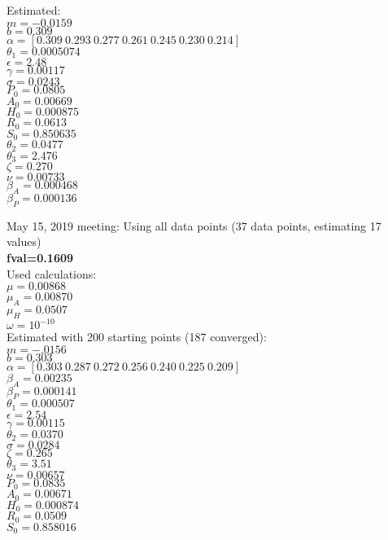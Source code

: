\documentclass[12pt]{article}
\begin{document}
\begin{multicols}{2}
Estimated: \\
$m=-0.0159$ \\
$b=0.309$\\
$\alpha=[0.309  \   0.293  \   0.277    \   0.261 \    0.245 \     0.230  \  0.214  ]$ \\
$\theta_1=0.0005074$\\
$\epsilon=2.48$ \\
$\gamma=0.00117$\\
$\sigma=0.0243$ \\
$P_0=0.0805$ \\
$A_0=0.00669$ \\
$H_0=0.000875$ \\
$R_0=0.0613$ \\
$S_0=0.850635$ \\
$\theta_2=0.0477$ \\
$\theta_3=2.476$ \\
$\zeta=0.270$ \\
$\nu=0.00733$ \\ 
$\beta_A=0.000468$ \\
$\beta_P=0.000136$ \\
\end{multicols}





\pagebreak
May 15, 2019 meeting:
Using all data points (37 data points, estimating 17 values) \\

\textbf{fval=0.1609} \\
Used calculations: \\
$\mu=0.00868$ \\
$\mu_{A}=0.00870$ \\
$\mu_{H}=0.0507$ \\
$\omega=10^{-10}$ \\ 

Estimated with 200 starting points (187 converged): \\
$m=-.0156$ \\
$b=0.303$\\
$\alpha=[0.303  \   0.287  \   0.272    \   0.256 \    0.240 \     0.225  \  0.209  ]$ \\
$\beta_A=0.00235$\\
$\beta_P=0.000141$\\
$\theta_1=0.000507$\\
$\epsilon=2.54$ \\
$\gamma=0.00115$\\
$\theta_2=0.0370$\\
$\sigma=0.0284$\\
$\zeta=0.265$\\
$\theta_3=3.51$\\ 
$\nu=0.00657$\\
$P_0=0.0835$\\
$A_0=0.00671$\\
$H_0=0.000874$\\
$R_0=0.0509$\\
$S_0=0.858016$\\
\end{document}
